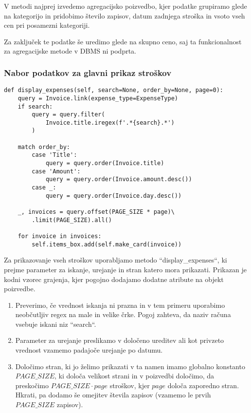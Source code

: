 \documentclass[a4paper,12pt,openright]{book}
\begin{document}
    \noindent
    V metodi najprej izvedemo agregacijsko poizvedbo, kjer podatke grupiramo glede na kategorijo in pridobimo število zapisov, datum zadnjega stroška in vsoto vseh cen pri posamezni kategoriji.

    Za zaključek te podatke še uredimo glede na skupno ceno, saj ta funkcionalnost za agregacijske metode v DBMS ni podprta.

    \subsubsection{Nabor podatkov za glavni prikaz stroškov}
    
\begin{verbatim}
def display_expenses(self, search=None, order_by=None, page=0):
    query = Invoice.link(expense_type=ExpenseType)
    if search:
        query = query.filter(
            Invoice.title.iregex(f'.*{search}.*')
        )

    match order_by:
        case 'Title':
            query = query.order(Invoice.title)
        case 'Amount':
            query = query.order(Invoice.amount.desc())
        case _:
            query = query.order(Invoice.day.desc())
    
    _, invoices = query.offset(PAGE_SIZE * page)\
        .limit(PAGE_SIZE).all()
    
    for invoice in invoices:
        self.items_box.add(self.make_card(invoice))
\end{verbatim}

    \noindent
    Za prikazovanje vseh stroškov uporabljamo metodo ``display\_expenses``, ki prejme parameter za iskanje, urejanje in stran katero mora prikazati. Prikazan je kodni vzorec grajenja, kjer pogojno dodajamo dodatne atribute na objekt poizvedbe. 
    \begin{enumerate}
        \item Preverimo, če vrednost iskanja ni prazna in v tem primeru uporabimo neobčutljiv regex na male in velike črke. Pogoj zahteva, da naziv računa vsebuje iskani niz ``search``.
        \item Parameter za urejanje preslikamo v določeno ureditev ali kot privzeto vrednost vzamemo padajoče urejanje po datumu.
        \item Določimo stran, ki jo želimo prikazati v ta namen imamo globalno konstanto $PAGE\_SIZE$, ki določa velikost strani in v poizvedbi določimo, da preskočimo $PAGE\_SIZE \cdot page$ stroškov, kjer $page$ določa zaporedno stran. Hkrati, pa dodamo še omejitev števila zapisov (vzamemo le prvih \newline $PAGE\_SIZE$ zapisov).
    \end{enumerate}  
\end{document}
